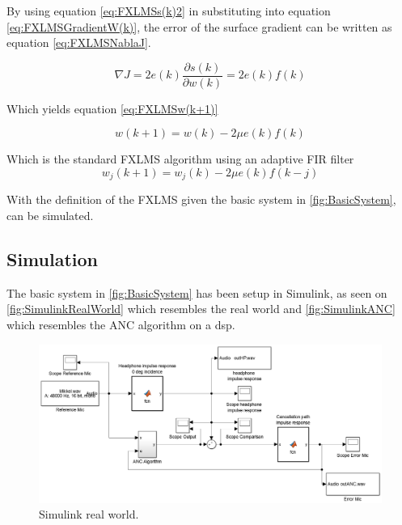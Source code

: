 By using equation \ref{eq:FXLMSs(k)2} in substituting into equation \ref{eq:FXLMSGradientW(k)}, the error of the surface gradient can be written as equation \ref{eq:FXLMSNablaJ}.

\begin{equation}\label{eq:FXLMSNablaJ}
\nabla J = 2e(k)\frac{\partial s(k)}{\partial w(k)} = 2e(k)f(k)
\end{equation}

Which yields equation \ref{eq:FXLMSw(k+1)}

\begin{equation}\label{eq:FXLMSw(k+1)}
w(k+1) = w(k) - 2\mu e(k)f(k)
\end{equation}

Which is the standard FXLMS algorithm using an adaptive FIR filter
\begin{equation}\label{eq:FXLMSw_j(k+1)}
w_j(k+1) = w_j(k) - 2\mu e(k)f(k-j)
\end{equation}

With the definition of the FXLMS given the basic system in \autoref{fig:BasicSystem}, can be simulated.







\subsection{Simulation} 
The basic system in \autoref{fig:BasicSystem} has been setup in Simulink, as seen on \autoref{fig:SimulinkRealWorld} which resembles the real world and \autoref{fig:SimulinkANC} which resembles the ANC algorithm on a dsp. 

\begin{figure}[H]
	\centering
	\includegraphics[width=1\textwidth]{figures/BasicSystem/SimulinkRealWorld}
	\caption{Simulink real world.}
	\label{fig:SimulinkRealWorld}
\end{figure}    

